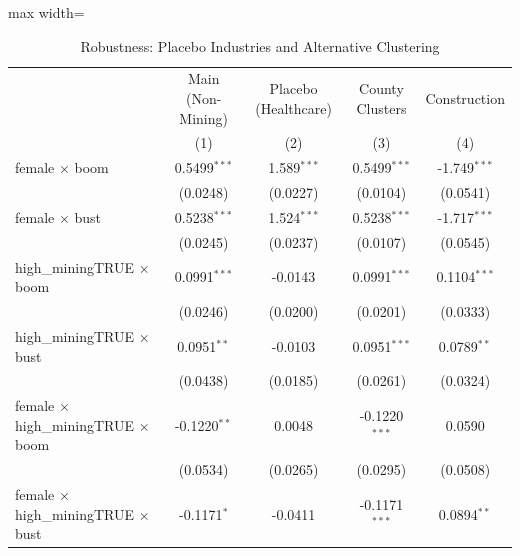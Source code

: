 
\begin{table}[htbp]
   \caption{\label{tab:robustness} Robustness: Placebo Industries and Alternative Clustering}
   \bigskip
   \centering
   \begin{adjustbox}{max width=\textwidth}
   \begin{tabular}{lcccc}
      \toprule
                                                        & Main (Non-Mining) & Placebo (Healthcare) & County Clusters & Construction \\   
                                                        & (1)               & (2)                  & (3)             & (4)\\  
      \midrule 
      female $\times$ boom                              & 0.5499$^{***}$    & 1.589$^{***}$        & 0.5499$^{***}$  & -1.749$^{***}$\\   
                                                        & (0.0248)          & (0.0227)             & (0.0104)        & (0.0541)\\   
      female $\times$ bust                              & 0.5238$^{***}$    & 1.524$^{***}$        & 0.5238$^{***}$  & -1.717$^{***}$\\   
                                                        & (0.0245)          & (0.0237)             & (0.0107)        & (0.0545)\\   
      high\_miningTRUE $\times$ boom                    & 0.0991$^{***}$    & -0.0143              & 0.0991$^{***}$  & 0.1104$^{***}$\\   
                                                        & (0.0246)          & (0.0200)             & (0.0201)        & (0.0333)\\   
      high\_miningTRUE $\times$ bust                    & 0.0951$^{**}$     & -0.0103              & 0.0951$^{***}$  & 0.0789$^{**}$\\   
                                                        & (0.0438)          & (0.0185)             & (0.0261)        & (0.0324)\\   
      female $\times$ high\_miningTRUE $\times$ boom    & -0.1220$^{**}$    & 0.0048               & -0.1220$^{***}$ & 0.0590\\   
                                                        & (0.0534)          & (0.0265)             & (0.0295)        & (0.0508)\\   
      female $\times$ high\_miningTRUE $\times$ bust    & -0.1171$^{*}$     & -0.0411              & -0.1171$^{***}$ & 0.0894$^{**}$\\   

\end{tabular}
\end{adjustbox}
\end{table}
